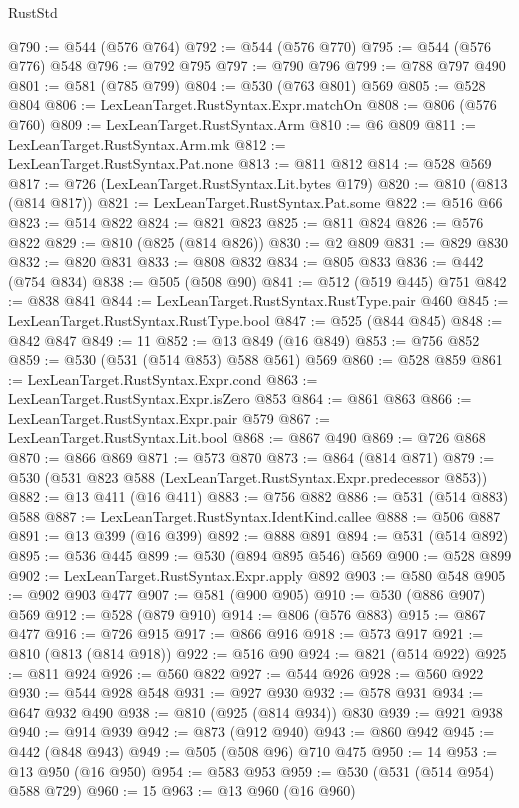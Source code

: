 \begin{lexlean}{RustStd}
\begin{coremodule}
@790 := @544 (@576 @764)
@792 := @544 (@576 @770)
@795 := @544 (@576 @776) @548
@796 := @792 @795
@797 := @790 @796
@799 := @788 @797 @490
@801 := @581 (@785 @799)
@804 := @530 (@763 @801) @569
@805 := @528 @804
@806 := LexLeanTarget.RustSyntax.Expr.matchOn
@808 := @806 (@576 @760)
@809 := LexLeanTarget.RustSyntax.Arm
@810 := @6 @809
@811 := LexLeanTarget.RustSyntax.Arm.mk
@812 := LexLeanTarget.RustSyntax.Pat.none
@813 := @811 @812
@814 := @528 @569
@817 := @726 (LexLeanTarget.RustSyntax.Lit.bytes @179)
@820 := @810 (@813 (@814 @817))
@821 := LexLeanTarget.RustSyntax.Pat.some
@822 := @516 @66
@823 := @514 @822
@824 := @821 @823
@825 := @811 @824
@826 := @576 @822
@829 := @810 (@825 (@814 @826))
@830 := @2 @809
@831 := @829 @830
@832 := @820 @831
@833 := @808 @832
@834 := @805 @833
@836 := @442 (@754 @834)
@838 := @505 (@508 @90)
@841 := @512 (@519 @445) @751
@842 := @838 @841
@844 := LexLeanTarget.RustSyntax.RustType.pair @460
@845 := LexLeanTarget.RustSyntax.RustType.bool
@847 := @525 (@844 @845)
@848 := @842 @847
@849 := 11
@852 := @13 @849 (@16 @849)
@853 := @756 @852
@859 := @530 (@531 (@514 @853) @588 @561) @569
@860 := @528 @859
@861 := LexLeanTarget.RustSyntax.Expr.cond
@863 := LexLeanTarget.RustSyntax.Expr.isZero @853
@864 := @861 @863
@866 := LexLeanTarget.RustSyntax.Expr.pair @579
@867 := LexLeanTarget.RustSyntax.Lit.bool
@868 := @867 @490
@869 := @726 @868
@870 := @866 @869
@871 := @573 @870
@873 := @864 (@814 @871)
@879 := @530 (@531 @823 @588 (LexLeanTarget.RustSyntax.Expr.predecessor @853))
@882 := @13 @411 (@16 @411)
@883 := @756 @882
@886 := @531 (@514 @883) @588
@887 := LexLeanTarget.RustSyntax.IdentKind.callee
@888 := @506 @887
@891 := @13 @399 (@16 @399)
@892 := @888 @891
@894 := @531 (@514 @892)
@895 := @536 @445
@899 := @530 (@894 @895 @546) @569
@900 := @528 @899
@902 := LexLeanTarget.RustSyntax.Expr.apply @892
@903 := @580 @548
@905 := @902 @903 @477
@907 := @581 (@900 @905)
@910 := @530 (@886 @907) @569
@912 := @528 (@879 @910)
@914 := @806 (@576 @883)
@915 := @867 @477
@916 := @726 @915
@917 := @866 @916
@918 := @573 @917
@921 := @810 (@813 (@814 @918))
@922 := @516 @90
@924 := @821 (@514 @922)
@925 := @811 @924
@926 := @560 @822
@927 := @544 @926
@928 := @560 @922
@930 := @544 @928 @548
@931 := @927 @930
@932 := @578 @931
@934 := @647 @932 @490
@938 := @810 (@925 (@814 @934)) @830
@939 := @921 @938
@940 := @914 @939
@942 := @873 (@912 @940)
@943 := @860 @942
@945 := @442 (@848 @943)
@949 := @505 (@508 @96) @710 @475
@950 := 14
@953 := @13 @950 (@16 @950)
@954 := @583 @953
@959 := @530 (@531 (@514 @954) @588 @729)
@960 := 15
@963 := @13 @960 (@16 @960)

\end{coremodule}
\end{lexlean}
